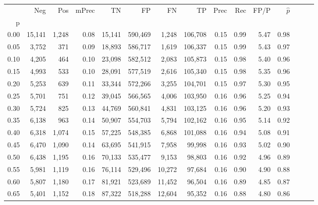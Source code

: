 \begin{tabular}{rrrrrrrrrrrrrrr}
\toprule
{} &      Neg &     Pos & mPrec &       TN &       FP &       FN &       TP &  Prec &   Rec &  FP/P & $\hat{p}$ \\
p    &          &         &       &          &          &          &          &       &       &       &           \\
\midrule
0.00 &   15,141 &   1,248 &  0.08 &   15,141 &  590,469 &    1,248 &  106,708 &  0.15 &  0.99 &  5.47 &      0.98 \\
0.05 &    3,752 &     371 &  0.09 &   18,893 &  586,717 &    1,619 &  106,337 &  0.15 &  0.99 &  5.43 &      0.97 \\
0.10 &    4,205 &     464 &  0.10 &   23,098 &  582,512 &    2,083 &  105,873 &  0.15 &  0.98 &  5.40 &      0.96 \\
0.15 &    4,993 &     533 &  0.10 &   28,091 &  577,519 &    2,616 &  105,340 &  0.15 &  0.98 &  5.35 &      0.96 \\
0.20 &    5,253 &     639 &  0.11 &   33,344 &  572,266 &    3,255 &  104,701 &  0.15 &  0.97 &  5.30 &      0.95 \\
0.25 &    5,701 &     751 &  0.12 &   39,045 &  566,565 &    4,006 &  103,950 &  0.16 &  0.96 &  5.25 &      0.94 \\
0.30 &    5,724 &     825 &  0.13 &   44,769 &  560,841 &    4,831 &  103,125 &  0.16 &  0.96 &  5.20 &      0.93 \\
0.35 &    6,138 &     963 &  0.14 &   50,907 &  554,703 &    5,794 &  102,162 &  0.16 &  0.95 &  5.14 &      0.92 \\
0.40 &    6,318 &   1,074 &  0.15 &   57,225 &  548,385 &    6,868 &  101,088 &  0.16 &  0.94 &  5.08 &      0.91 \\
0.45 &    6,470 &   1,090 &  0.14 &   63,695 &  541,915 &    7,958 &   99,998 &  0.16 &  0.93 &  5.02 &      0.90 \\
0.50 &    6,438 &   1,195 &  0.16 &   70,133 &  535,477 &    9,153 &   98,803 &  0.16 &  0.92 &  4.96 &      0.89 \\
0.55 &    5,981 &   1,119 &  0.16 &   76,114 &  529,496 &   10,272 &   97,684 &  0.16 &  0.90 &  4.90 &      0.88 \\
0.60 &    5,807 &   1,180 &  0.17 &   81,921 &  523,689 &   11,452 &   96,504 &  0.16 &  0.89 &  4.85 &      0.87 \\
0.65 &    5,401 &   1,152 &  0.18 &   87,322 &  518,288 &   12,604 &   95,352 &  0.16 &  0.88 &  4.80 &      0.86 \\

\end{tabular}
